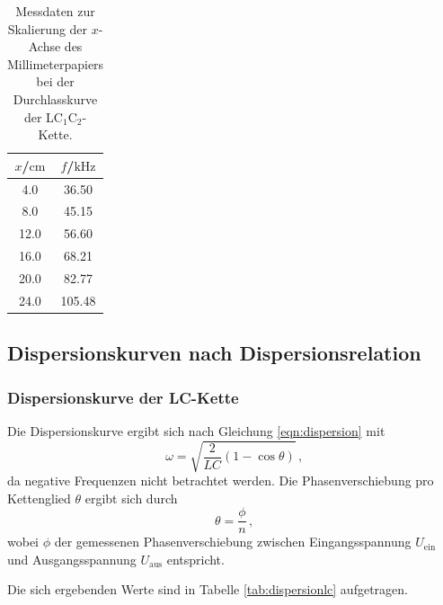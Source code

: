 \begin{table}
	\caption{Messdaten zur Skalierung der $x$-Achse des Millimeterpapiers bei der 
	Durchlasskurve der LC$_1$C$_2$-Kette.}
	\label{tab:skalaLCC}
	\centering
	\begin{tabular}{cc}
	\toprule
	$x$/$\si{\centi\meter}$ & $f$/$\si{\kilo\hertz}$ \\
	\midrule
		4.0 & 36.50 \\
		8.0 & 45.15 \\
		12.0 & 56.60 \\
		16.0 & 68.21 \\
		20.0 & 82.77 \\
		24.0 & 105.48 \\
	\bottomrule
	\end{tabular}
\end{table}




\FloatBarrier
\subsection{Dispersionskurven nach Dispersionsrelation}

\subsubsection{Dispersionskurve der LC-Kette}
Die Dispersionskurve ergibt sich nach Gleichung \eqref{eqn:dispersion} mit
\begin{equation}
	\label{eqn:dispisi}
	\omega = \sqrt{\frac{2}{LC}(1-\cos\theta)} \, \text{,}
\end{equation}
da negative Frequenzen nicht betrachtet werden.
Die Phasenverschiebung pro Kettenglied $\theta$ ergibt sich durch
\begin{equation}
	\theta = \frac{\phi}{n} \, \text{,}
\end{equation}
wobei $\phi$ der gemessenen Phasenverschiebung zwischen Eingangsspannung $U_{\text{ein}}$
und Ausgangsspannung $U_{\text{aus}}$ entspricht.

Die sich ergebenden Werte sind in Tabelle \ref{tab:dispersionlc} aufgetragen.

